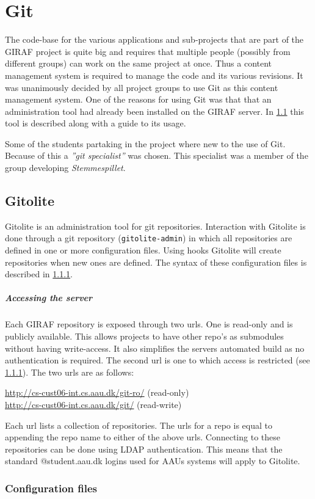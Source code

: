 \chapter{Git}
The code-base for the various applications and sub-projects that are part of the GIRAF project is quite big and requires that multiple people (possibly from different groups) can work on the same project at once.
Thus a content management system is required to manage the code and its various revisions. 
It was unanimously decided by all project groups to use Git as this content management system.
One of the reasons for using Git was that that an administration tool had already been installed on the GIRAF server.
In \cref{git:gitolite} this tool is described along with a guide to its usage.

Some of the students partaking in the project where new to the use of Git.
Because of this a \textit{''git specialist''} was chosen.
This specialist was a member of the group developing \textit{Stemmespillet}.

\section{Gitolite}\label{git:gitolite}
Gitolite is an administration tool for git repositories.
Interaction with Gitolite is done through a git repository (\texttt{gitolite-admin}) in which all repositories are defined in one or more configuration files.
Using hooks Gitolite will create repositories when new ones are defined.
The syntax of these configuration files is described in \cref{git:gitolite:config}.

\paragraph{Accessing the server}
Each GIRAF repository is exposed through two urls.
One is read-only and is publicly available.
This allows projects to have other repo's as submodules without having write-access.
It also simplifies the servers automated build as no authentication is required.
The second url is one to which access is restricted (see \cref{git:gitolite:config}).
The two urls are as follows:
\begin{center}
\url{http://cs-cust06-int.cs.aau.dk/git-ro/} (read-only)\\
\url{http://cs-cust06-int.cs.aau.dk/git/} (read-write)
\end{center}
Each url lists a collection of repositories.
The urls for a repo is equal to appending the repo name to either of the above urls.
Connecting to these repositories can be done using LDAP authentication.
This means that the standard @student.aau.dk logins used for AAUs systems will apply to Gitolite.

\subsection{Configuration files}\label{git:gitolite:config}

